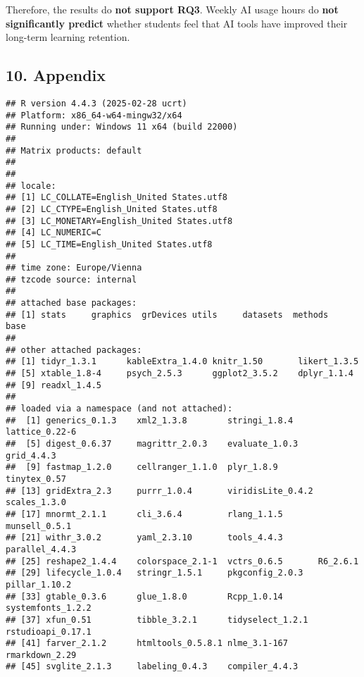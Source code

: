 \documentclass[
]{article}
\begin{document}
Therefore, the results do \textbf{not support RQ3}. Weekly AI usage
hours do \textbf{not significantly predict} whether students feel that
AI tools have improved their long-term learning retention.

\subsection{10. Appendix}\label{appendix}

\begin{verbatim}
## R version 4.4.3 (2025-02-28 ucrt)
## Platform: x86_64-w64-mingw32/x64
## Running under: Windows 11 x64 (build 22000)
## 
## Matrix products: default
## 
## 
## locale:
## [1] LC_COLLATE=English_United States.utf8 
## [2] LC_CTYPE=English_United States.utf8   
## [3] LC_MONETARY=English_United States.utf8
## [4] LC_NUMERIC=C                          
## [5] LC_TIME=English_United States.utf8    
## 
## time zone: Europe/Vienna
## tzcode source: internal
## 
## attached base packages:
## [1] stats     graphics  grDevices utils     datasets  methods   base     
## 
## other attached packages:
## [1] tidyr_1.3.1      kableExtra_1.4.0 knitr_1.50       likert_1.3.5    
## [5] xtable_1.8-4     psych_2.5.3      ggplot2_3.5.2    dplyr_1.1.4     
## [9] readxl_1.4.5    
## 
## loaded via a namespace (and not attached):
##  [1] generics_0.1.3    xml2_1.3.8        stringi_1.8.4     lattice_0.22-6   
##  [5] digest_0.6.37     magrittr_2.0.3    evaluate_1.0.3    grid_4.4.3       
##  [9] fastmap_1.2.0     cellranger_1.1.0  plyr_1.8.9        tinytex_0.57     
## [13] gridExtra_2.3     purrr_1.0.4       viridisLite_0.4.2 scales_1.3.0     
## [17] mnormt_2.1.1      cli_3.6.4         rlang_1.1.5       munsell_0.5.1    
## [21] withr_3.0.2       yaml_2.3.10       tools_4.4.3       parallel_4.4.3   
## [25] reshape2_1.4.4    colorspace_2.1-1  vctrs_0.6.5       R6_2.6.1         
## [29] lifecycle_1.0.4   stringr_1.5.1     pkgconfig_2.0.3   pillar_1.10.2    
## [33] gtable_0.3.6      glue_1.8.0        Rcpp_1.0.14       systemfonts_1.2.2
## [37] xfun_0.51         tibble_3.2.1      tidyselect_1.2.1  rstudioapi_0.17.1
## [41] farver_2.1.2      htmltools_0.5.8.1 nlme_3.1-167      rmarkdown_2.29   
## [45] svglite_2.1.3     labeling_0.4.3    compiler_4.4.3
\end{verbatim}
\end{document}
